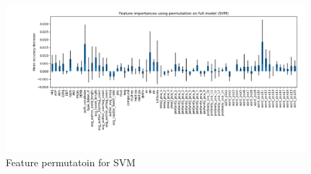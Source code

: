 \vspace{0.1cm}

\begin{figure}
         \centering
         \includegraphics[width=\textwidth]{images/feature_importance_SVM.png}
         \caption{Feature permutatoin for SVM}
         \label{fig:fi_svm}
     \end{figure}